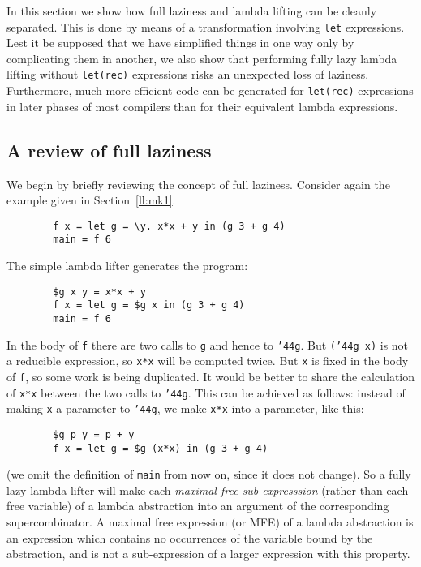 In this section we show how full laziness and lambda lifting can be
cleanly separated.  This is done by means of a transformation
involving \mbox{\tt let} expressions.  Lest it be supposed that we have
simplified things in one way only by complicating them in another, we
also show that performing fully lazy lambda lifting without \mbox{\tt let(rec)}
expressions risks an unexpected loss of laziness.  Furthermore, much
more efficient code can be generated for \mbox{\tt let(rec)} expressions in later
phases of most compilers than for their equivalent lambda expressions.

\subsection{A review of full laziness}

We begin by briefly reviewing the concept of full laziness.
Consider again the example given in Section~\ref{ll:mk1}.
\begin{verbatim}
        f x = let g = \y. x*x + y in (g 3 + g 4)
        main = f 6
\end{verbatim}
The simple lambda lifter generates the program:
\begin{verbatim}
        $g x y = x*x + y
        f x = let g = $g x in (g 3 + g 4)
        main = f 6
\end{verbatim}
In the body of \mbox{\tt f} there are two calls to \mbox{\tt g} and hence to \mbox{\tt {\char'44}g}.
But \mbox{\tt ({\char'44}g\ x)} is not a reducible expression, so
\mbox{\tt x*x} will be computed twice.  But \mbox{\tt x} is fixed in the body of \mbox{\tt f}, so
some work is being duplicated.  It would be better to share the
calculation of \mbox{\tt x*x} between the two calls to \mbox{\tt {\char'44}g}.  This can be
achieved as follows: instead of making \mbox{\tt x} a parameter to \mbox{\tt {\char'44}g}, we
make \mbox{\tt x*x} into a parameter, like this:
\begin{verbatim}
        $g p y = p + y
        f x = let g = $g (x*x) in (g 3 + g 4)
\end{verbatim}
(we omit the definition of \mbox{\tt main} from now on, since it does not
change).  So a fully lazy lambda lifter will make each {\em maximal
free sub-expresssion\/} (rather than each free variable)
of a lambda abstraction into an argument of the
corresponding supercombinator.  A maximal free expression (or MFE) of
a lambda abstraction is an expression which contains no occurrences of
the variable bound by the abstraction, and is not a sub-expression of
a larger expression with this property.

